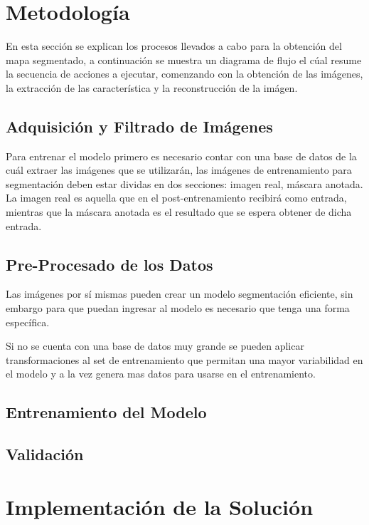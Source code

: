 \section{Metodología}
En esta sección se explican los procesos llevados a cabo para la obtención del mapa segmentado, a continuación se muestra un diagrama de flujo el cúal resume la secuencia de acciones a ejecutar, comenzando con la obtención de las imágenes, la extracción de las característica y la reconstrucción de la imágen.


\subsection{Adquisición y Filtrado de Imágenes}
Para entrenar el modelo primero es necesario contar con una base de datos de la cuál extraer las imágenes que se utilizarán, las imágenes de entrenamiento para segmentación deben estar dividas en dos secciones: imagen real, máscara anotada. La imagen real es aquella que en el post-entrenamiento recibirá como entrada, mientras que la máscara anotada es el resultado que se espera obtener de dicha entrada. 

\subsection{Pre-Procesado de los Datos}
Las imágenes por sí mismas pueden crear un modelo segmentación eficiente, sin embargo para que puedan ingresar al modelo es necesario que tenga una forma específica. 


Si no se cuenta con una base de datos muy grande se pueden aplicar transformaciones al set de entrenamiento que permitan una mayor variabilidad en el modelo y a la vez genera mas datos para usarse en el entrenamiento.

\subsection{Entrenamiento del Modelo}

\subsection{Validación}

\section{Implementación de la Solución}


